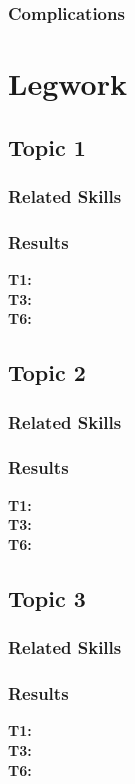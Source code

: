 \documentclass{ShadowTeXSR5}
\begin{document}
\subsubsection{Complications}
\lipsum[1]

\section{Legwork}
\lipsum[1]
\subsection{Topic 1}
\lipsum[1]
\subsubsection{Related Skills}
\lipsum[1]
\subsubsection{Results}
\textbf{T1:}\\
\textbf{T3:}\\
\textbf{T6:}\\

\subsection{Topic 2}
\lipsum[1]
\subsubsection{Related Skills}
\lipsum[1]
\subsubsection{Results}
\lipsum[1]
\textbf{T1:}\\
\textbf{T3:}\\
\textbf{T6:}\\

\subsection{Topic 3}
\lipsum[1]
\subsubsection{Related Skills}
\lipsum[1]
\subsubsection{Results}
\lipsum[1]
\textbf{T1:}\\
\textbf{T3:}\\
\textbf{T6:}\\
\end{document}
